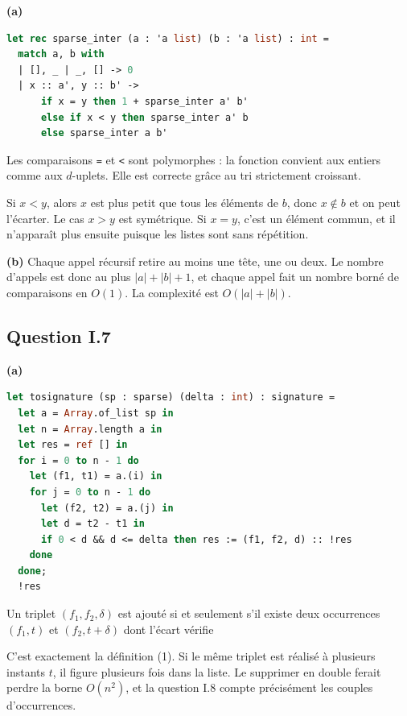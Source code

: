 \documentclass[11pt,a4paper]{article}
\newcommand{\equationajustee}[1]{%
  \sbox{\boiteequation}{$\displaystyle #1$}%
  \ifdim\wd\boiteequation>\linewidth
    \[\resizebox{\linewidth}{!}{\usebox{\boiteequation}}\]%
  \else
    \[#1\]%
  \fi}
\begin{document}
\textbf{(a)}

\begin{lstlisting}[language=Caml]
let rec sparse_inter (a : 'a list) (b : 'a list) : int =
  match a, b with
  | [], _ | _, [] -> 0
  | x :: a', y :: b' ->
      if x = y then 1 + sparse_inter a' b'
      else if x < y then sparse_inter a' b
      else sparse_inter a b'
\end{lstlisting}

Les comparaisons \texttt{=} et \texttt{\textless{}} sont polymorphes : la fonction convient aux entiers comme aux \(d\)-uplets. Elle est correcte grâce au tri strictement croissant.

Si \(x<y\), alors \(x\) est plus petit que tous les éléments de \(b\), donc \(x\notin b\) et on peut l'écarter. Le cas \(x>y\) est symétrique. Si \(x=y\), c'est un élément commun, et il n'apparaît plus ensuite puisque les listes sont sans répétition.

\textbf{(b)} Chaque appel récursif retire au moins une tête, une ou deux. Le nombre d'appels est donc au plus \(|a|+|b|+1\), et chaque appel fait un nombre borné de comparaisons en \(O(1)\). La complexité est \(\boxed{O(|a|+|b|)}\).

\hypertarget{question-i.7}{%
\subsection{Question I.7}\label{question-i.7}}

\textbf{(a)}

\begin{lstlisting}[language=Caml]
let tosignature (sp : sparse) (delta : int) : signature =
  let a = Array.of_list sp in
  let n = Array.length a in
  let res = ref [] in
  for i = 0 to n - 1 do
    let (f1, t1) = a.(i) in
    for j = 0 to n - 1 do
      let (f2, t2) = a.(j) in
      let d = t2 - t1 in
      if 0 < d && d <= delta then res := (f1, f2, d) :: !res
    done
  done;
  !res
\end{lstlisting}

Un triplet \((f_1,f_2,\delta)\) est ajouté si et seulement s'il existe deux occurrences \((f_1,t)\) et \((f_2,t+\delta)\) dont l'écart vérifie

\equationajustee{0<\delta\le\Delta.}

C'est exactement la définition (1). Si le même triplet est réalisé à plusieurs instants \(t\), il figure plusieurs fois dans la liste. Le supprimer en double ferait perdre la borne \(O(n^2)\), et la question I.8 compte précisément les couples d'occurrences.
\end{document}
